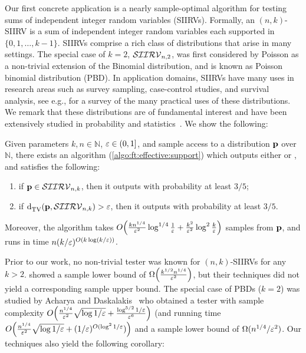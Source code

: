 Our first concrete application is a nearly sample-optimal algorithm for testing
sums of independent integer random variables (SIIRVs). 
Formally, an $(n, k)$-SIIRV is a sum of independent integer random variables each supported
in $\{0, 1, \ldots, k-1\}$.
SIIRVs comprise a rich class of distributions that arise in many settings. The special case of $k=2$, $\classksiirv[n]{2}$,
was first considered by Poisson \cite{Poisson:37} as a non-trivial extension of the Binomial distribution,
and is known as Poisson binomial distribution (PBD). In application domains, SIIRVs have many uses in research areas
such as survey sampling, case-control studies, and survival analysis, see e.g., \cite{CL:97} for a survey of the many practical uses of these distributions.
We remark that these distributions are of fundamental interest and have been extensively 
studied in probability and statistics~\cite{Chernoff:52,Hoeffding:63,DP:09, Presman:83,Kruopis:86,BHJ:92, CL10,CGS11}.
We show the following:

\begin{theorem}\label{theo:testing:ksiirv}
    Given parameters $k,n\in\mathbb{N}$, $\eps\in(0,1]$, and sample access to a distribution $\p$ over $\mathbb{N}$, there exists an algorithm (\cref{algo:ft:effective:support}) which outputs either \accept or \reject, and satisfies the following:
    \begin{enumerate}
        \item if $\p \in \classksiirv[n]{k}$, then it outputs \accept with probability at least $3/5$;
        \item if $\totalvardist{\p}{\classksiirv[n]{k}}>\eps$, then it outputs \reject with probability at least $3/5$.
    \end{enumerate}
    Moreover, the algorithm takes $\bigO{\frac{k n^{1/4}}{\eps^2}\log^{1/4}\frac{1}{\eps} + \frac{k^2}{\eps^2} \log^2\frac{k}{\eps}}$ samples from $\p$, and runs in time $n(k/\eps)^{\bigO{k\log(k/\eps)}}$.
\end{theorem}

Prior to our work, no non-trivial tester was known for $(n, k)$-SIIRVs for any $k>2$. 
\cite{CDGR:16} showed a sample lower bound of $\bigOmega{\frac{k^{1/2}n^{1/4}}{\eps^2}}$, but their techniques
did not yield a corresponding sample upper bound. The special case of PBDs ($k=2$) was studied by 
Acharya and Daskalakis~\cite{AD:15} who obtained a tester with sample complexity 
$\bigO{\frac{n^{1/4}}{\eps^2}\sqrt{\log1/\eps}+\frac{\log^{5/2}1/\eps}{\eps^6}}$ (and running time $\bigO{\frac{n^{1/4}}{\eps^2}\sqrt{\log1/\eps}+(1/\eps)^{O(\log^2 1/\eps})}$ and a sample lower bound of $\Omega(n^{1/4}/\eps^2)$. 
Our techniques also yield the following corollary: 

